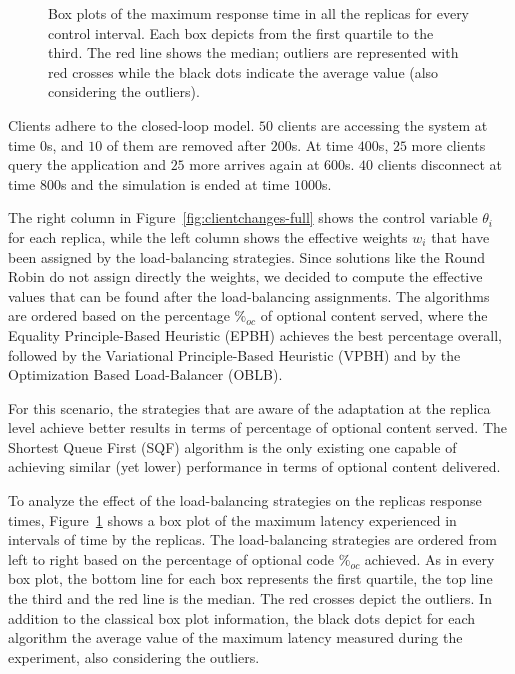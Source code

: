 \begin{figure}
\centering

\vspace{-4mm}
\caption{Box plots of the maximum response time in all the replicas
  for every control interval. Each box depicts from the first quartile
  to the third. The red line shows the median; outliers are
  represented with red crosses while the black dots indicate the
  average value (also considering the outliers).}
\label{fig:clientchanges-boxplot}
\end{figure}

Clients adhere to the closed-loop model. $50$ clients are accessing
the system at time $0$s, and $10$ of them are removed after $200$s. At
time $400$s, $25$ more clients query the application and $25$ more
arrives again at $600$s. $40$ clients disconnect at time $800$s and
the simulation is ended at time $1000$s.

The right column in Figure~\ref{fig:clientchanges-full} shows the
control variable $\theta_i$ for each replica, while the left column
shows the effective weights $w_i$ that have been assigned by the
load-balancing strategies. Since solutions like the Round Robin do not
assign directly the weights, we decided to compute the effective
values that can be found after the load-balancing assignments. The
algorithms are ordered based on the percentage $\%_{oc}$ of optional
content served, where the Equality Principle-Based Heuristic (EPBH)
achieves the best percentage overall, followed by the Variational
Principle-Based Heuristic (VPBH) and by the Optimization Based
Load-Balancer (OBLB).

For this scenario, the strategies that are aware of the adaptation at
the replica level achieve better results in terms of percentage of
optional content served. The Shortest Queue First (SQF) algorithm is
the only existing one capable of achieving similar (yet lower)
performance in terms of optional content delivered.

To analyze the effect of the load-balancing strategies on the replicas
response times, Figure~\ref{fig:clientchanges-boxplot} shows a box
plot of the maximum latency experienced in intervals of time by the
replicas. The load-balancing strategies are ordered from left to right
based on the percentage of optional code $\%_{oc}$ achieved. As in
every box plot, the bottom line for each box represents the first
quartile, the top line the third and the red line is the median. The
red crosses depict the outliers. In addition to the classical box plot
information, the black dots depict for each algorithm the average
value of the maximum latency measured during the experiment, also
considering the outliers.

